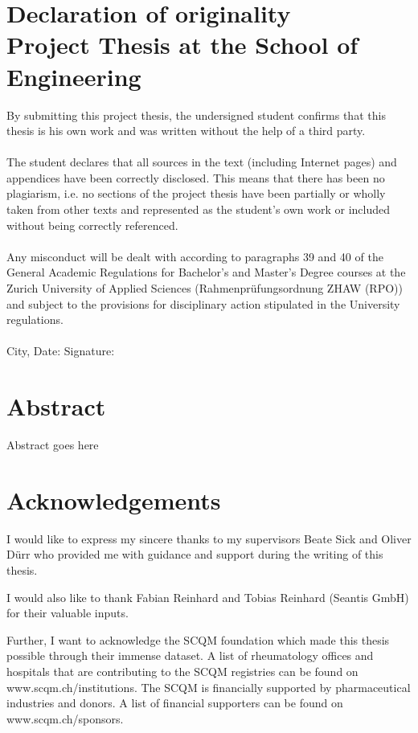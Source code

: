 \documentclass[12pt]{article}
\begin{document}
\section*{Declaration of originality\\ \large{Project Thesis at the School of Engineering}}
By submitting this project thesis, the undersigned student confirms that this thesis is his own work and was written without the help of a third party. \\
\\
The student declares that all sources in the text (including Internet pages) and appendices have been correctly disclosed. This means that there has been no plagiarism, i.e. no sections of the project thesis have been partially or wholly taken from other texts and represented as the student’s own work or included without being correctly referenced. \\
\\
Any misconduct will be dealt with according to paragraphs 39 and 40 of the General Academic Regulations for Bachelor’s and Master’s Degree courses at the Zurich University of Applied Sciences (Rahmenprüfungsordnung ZHAW (RPO)) and subject to the provisions for disciplinary action stipulated in the University regulations.\\
\vspace{3cm} \\
City, Date: \hspace{5cm} Signature:

\newpage

\section*{Abstract}
Abstract goes here

\newpage

\section*{Acknowledgements}
I would like to express my sincere thanks to my supervisors Beate Sick and Oliver Dürr who provided me with guidance and support during the writing of this thesis. 

I would also like to thank Fabian Reinhard and Tobias Reinhard (Seantis GmbH) for their valuable inputs. 

Further, I want to acknowledge the SCQM foundation which made this thesis possible through their immense dataset. A list of rheumatology offices and hospitals that are contributing to the SCQM registries can be found on www.scqm.ch/institutions. The SCQM is financially supported by pharmaceutical industries and donors. A list of financial supporters can be found on www.scqm.ch/sponsors.
\end{document}
